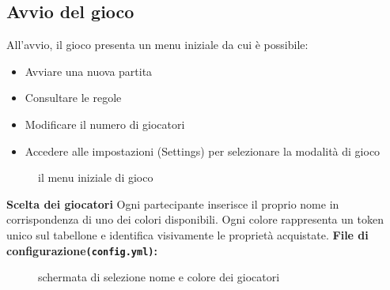 \subsection{Avvio del gioco}
All’avvio, il gioco presenta un menu iniziale da cui è possibile:\newline
\begin{itemize}
    \item Avviare una nuova partita
    \item Consultare le regole
    \item Modificare il numero di giocatori
    \item Accedere alle impostazioni (Settings) per selezionare la modalità di gioco
\end{itemize}
\begin{figure}[H]
    \centering
    \caption{il menu iniziale di gioco}
	\label{img:gamescreen}
\end{figure}
\textbf{Scelta dei giocatori}\newline
Ogni partecipante inserisce il proprio nome in corrispondenza di uno dei colori disponibili. Ogni colore rappresenta un token unico sul tabellone e identifica visivamente le proprietà acquistate.\newline
\textbf{File di configurazione\texttt{(config.yml)}:}\newline
\begin{figure}[H]
    \centering
    \caption{schermata di selezione nome e colore dei giocatori}
	\label{img:gamescreen}
\end{figure}
